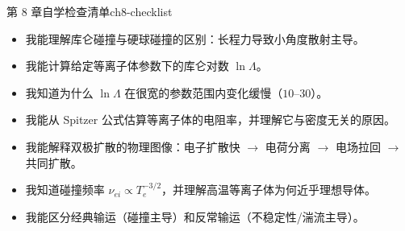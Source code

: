 \begin{checklistbox}{第 8 章自学检查清单}{ch8-checklist}
\begin{itemize}[leftmargin=*,label=$\square$]
\item 我能理解库仑碰撞与硬球碰撞的区别：长程力导致小角度散射主导。
\item 我能计算给定等离子体参数下的库仑对数 $\ln\Lambda$。
\item 我知道为什么 $\ln\Lambda$ 在很宽的参数范围内变化缓慢（$10$--$30$）。
\item 我能从 Spitzer 公式估算等离子体的电阻率，并理解它与密度无关的原因。
\item 我能解释双极扩散的物理图像：电子扩散快 $\to$ 电荷分离 $\to$ 电场拉回 $\to$ 共同扩散。
\item 我知道碰撞频率 $\nu_{ei} \propto T_e^{-3/2}$，并理解高温等离子体为何近乎理想导体。
\item 我能区分经典输运（碰撞主导）和反常输运（不稳定性/湍流主导）。
\end{itemize}
\end{checklistbox}


\endinput
